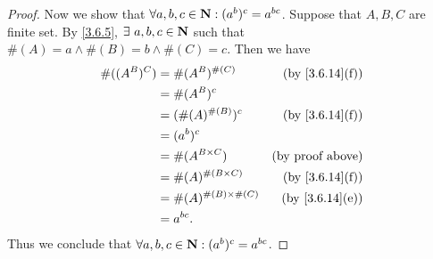 \begin{proof}
  Now we show that \(\forall a, b, c \in \mathbf{N} : (a^b)^c = a^{bc}\).
  Suppose that \(A, B, C\) are finite set.
  By \cref{3.6.5}, \(\exists\ a, b, c \in \N\) such that \(\#(A) = a \land \#(B) = b \land \#(C) = c\).
  Then we have
  \begin{align*}
    \#((A^B)^C) & = \#(A^B)^{\#(C)}            & \text{(by \cref{3.6.14}(f))} \\
                & = \#(A^B)^c                                                 \\
                & = (\#(A)^{\#(B)})^c          & \text{(by \cref{3.6.14}(f))} \\
                & = (a^b)^c                                                   \\
                & = \#(A^{B \times C})         & \text{(by proof above)}      \\
                & = \#(A)^{\#(B \times C)}     & \text{(by \cref{3.6.14}(f))} \\
                & = \#(A)^{\#(B) \times \#(C)} & \text{(by \cref{3.6.14}(e))} \\
                & = a^{bc}.
  \end{align*}
  Thus we conclude that \(\forall a, b, c \in \mathbf{N} : (a^b)^c = a^{bc}\).


\end{proof}
